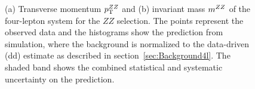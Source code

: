 \begin{figure}[htbp]
\begin{center}
\caption{\label{fig:kindists_zz}(a) Transverse momentum $p_{\mathrm{T}}^{ZZ}$ and (b) invariant mass $m^{ZZ}$ of the 
           four-lepton system for the $ZZ$ selection. The points represent the observed data and the 
           histograms show the prediction from simulation, where the background
           is normalized to the data-driven (dd) estimate as described in section~\ref{sec:Background4l}. The shaded band 
           shows the combined statistical and systematic uncertainty on the prediction. 
}
\end{center}
\end{figure}

